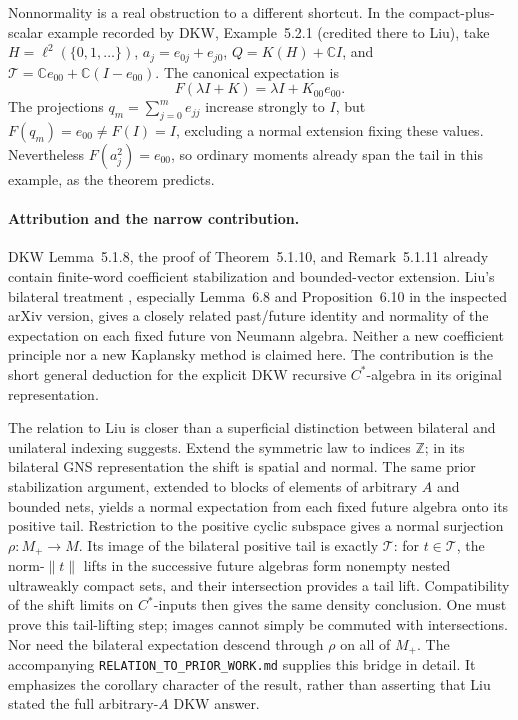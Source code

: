 \documentclass[11pt]{article}
\newcommand{\T}{\mathcal T}
\newcommand{\norm}[1]{\lVert#1\rVert}
\begin{document}
Nonnormality is a real obstruction to a different shortcut.
In the compact-plus-scalar example recorded by DKW, Example~5.2.1
(credited there to Liu), take \(H=\ell^2(\{0,1,\ldots\})\),
\(a_j=e_{0j}+e_{j0}\), \(Q=K(H)+\mathbb CI\), and
\(\T=\mathbb Ce_{00}+\mathbb C(I-e_{00})\). The canonical expectation is
\[
 F(\lambda I+K)=\lambda I+K_{00}e_{00}.
\]
The projections \(q_m=\sum_{j=0}^m e_{jj}\) increase strongly to \(I\),
but \(F(q_m)=e_{00}\ne F(I)=I\), excluding a normal extension fixing
these values. Nevertheless \(F(a_j^2)=e_{00}\), so ordinary moments
already span the tail in this example, as the theorem predicts.

\paragraph{Attribution and the narrow contribution.}
DKW Lemma~5.1.8, the proof of Theorem~5.1.10, and Remark~5.1.11 already
contain finite-word coefficient stabilization and bounded-vector
extension. Liu's bilateral treatment \cite[\S6.2]{Liu}, especially
Lemma~6.8 and Proposition~6.10 in the inspected arXiv version, gives
a closely related past/future identity and normality of the expectation
on each fixed future von Neumann algebra. Neither a new coefficient
principle nor a new Kaplansky method is claimed here. The contribution
is the short general deduction for the explicit DKW recursive
\(C^*\)-algebra in its original representation.

The relation to Liu is closer than a superficial distinction between
bilateral and unilateral indexing suggests. Extend the symmetric law
to indices \(\mathbb Z\); in its bilateral GNS representation the shift
is spatial and normal. The same prior stabilization argument, extended
to blocks of elements of arbitrary \(A\) and bounded nets, yields a
normal expectation from each fixed future algebra onto its positive
tail. Restriction to the positive cyclic subspace gives a normal
surjection \(\rho:M_+\to M\). Its image of the bilateral positive tail
is exactly \(\T\): for \(t\in\T\), the norm-\(\norm t\) lifts in the
successive future algebras form nonempty nested ultraweakly compact
sets, and their intersection provides a tail lift. Compatibility of
the shift limits on \(C^*\)-inputs then gives the same density conclusion.
One must prove this tail-lifting step; images cannot simply be commuted
with intersections. Nor need the bilateral expectation descend through
\(\rho\) on all of \(M_+\). The accompanying
\texttt{RELATION\_TO\_PRIOR\_WORK.md} supplies this bridge in detail.
It emphasizes the corollary character of the result, rather than
asserting that Liu stated the full arbitrary-\(A\) DKW answer.
\end{document}
